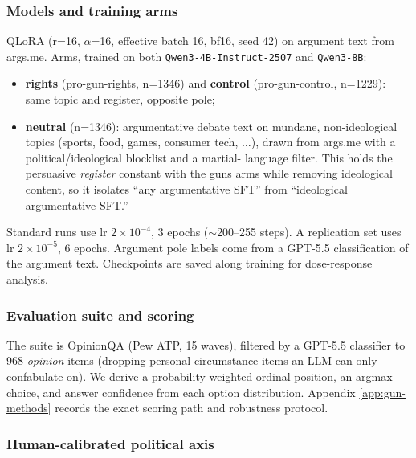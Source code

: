 \documentclass[11pt]{article}
\begin{document}
\subsubsection{Models and training arms}

QLoRA (r=16, $\alpha$=16, effective batch 16, bf16, seed 42) on argument text from
args.me. Arms, trained on both \texttt{Qwen3-4B-Instruct-2507} and
\texttt{Qwen3-8B}:
\begin{itemize}
  \item \textbf{rights} (pro-gun-rights, n=1346) and \textbf{control}
        (pro-gun-control, n=1229): same topic and register, opposite pole;
  \item \textbf{neutral} (n=1346): argumentative debate text on mundane,
        non-ideological topics (sports, food, games, consumer tech, $\ldots$),
        drawn from args.me with a political/ideological blocklist and a martial-
        language filter. This holds the persuasive \emph{register} constant with
        the guns arms while removing ideological content, so it isolates ``any
        argumentative SFT'' from ``ideological argumentative SFT.''
\end{itemize}
Standard runs use lr $2\times10^{-4}$, 3 epochs ($\sim$200--255 steps). A
replication set uses lr $2\times10^{-5}$, 6 epochs. Argument pole labels come from
a GPT-5.5 classification of the argument text. Checkpoints are saved along
training for dose-response analysis.

\subsubsection{Evaluation suite and scoring}

The suite is OpinionQA (Pew ATP, 15 waves), filtered by a GPT-5.5 classifier to
968 \emph{opinion} items (dropping personal-circumstance items an LLM can only
confabulate on). We derive a probability-weighted ordinal position, an argmax
choice, and answer confidence from each option distribution. Appendix
\ref{app:gun-methods} records the exact scoring path and robustness protocol.

\subsubsection{Human-calibrated political axis}
\end{document}
